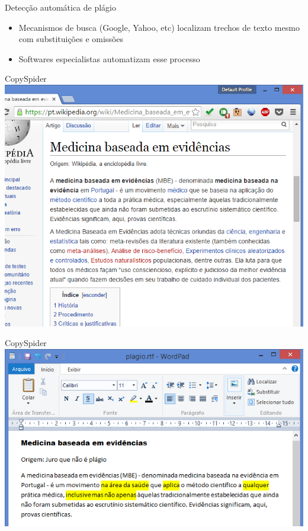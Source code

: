\documentclass{beamer}
\begin{document}
\begin{frame}{Detecção automática de plágio}
  \begin{itemize}
    \footnotesize
  \item Mecanismos de busca (Google, Yahoo, etc) localizam trechos de
    texto mesmo com substituições e omissões
   \bigskip
  \item Softwares especialistas automatizam esse processo
  \end{itemize}
\end{frame}

\begin{frame}{CopySpider}
  \centering
  \includegraphics[height=.95\textheight]{Referencias/fonte}
\end{frame}

\begin{frame}{CopySpider}
  \centering
  \includegraphics[width=\textwidth]{Referencias/plagio}
\end{frame}
\end{document}
